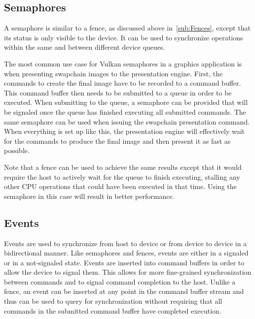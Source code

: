     \subsection{Semaphores}
    \label{sub:Semaphores}
      A semaphore is similar to a fence, as discussed above in~\ref{sub:Fences}, except that its status is only visible to the device. It can be used to synchronize operations within the same and between different device queues.

      The most common use case for Vulkan semaphores in a graphics \gls{application} is when presenting swapchain images to the presentation engine. First, the commands to create the final image have to be recorded to a command buffer. This command buffer then needs to be submitted to a queue in order to be executed. When submitting to the queue, a semaphore can be provided that will be signaled once the queue has finished executing all submitted commands. The same semaphore can be used when issuing the swapchain presentation command. When everything is set up like this, the presentation engine will effectively wait for the commands to produce the final image and then present it as fast as possible.

      Note that a fence can be used to achieve the same results except that it would require the \gls{host} to actively wait for the queue to finish executing, stalling any other CPU operations that could have been executed in that time. Using the semaphore in this case will result in better performance.

    \subsection{Events}
    \label{sub:Events}

      Events are used to synchronize from \gls{host} to device or from device to device in a bidirectional manner. Like semaphores and fences, events are either in a signaled or in a not-signaled state. Events are inserted into command buffers in order to allow the device to signal them. This allows for more fine-grained synchronization between commands and to signal command completion to the \gls{host}. Unlike a fence, an event can be inserted at any point in the command buffer stream and thus can be used to query for synchronization without requiring that all commands in the submitted command buffer have completed execution.

